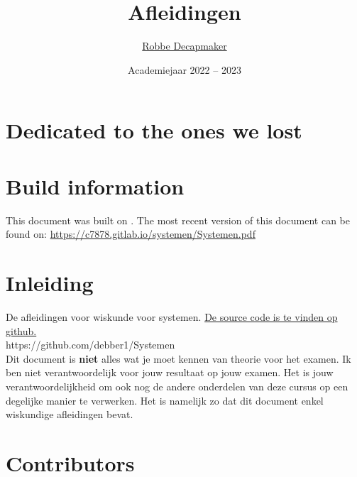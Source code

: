 \documentclass[a4paper,kul]{kulakarticle} %
\date{Academiejaar 2022 -- 2023}
\title{Afleidingen}
\author{\href{https://github.com/debber1}{Robbe Decapmaker}}
\begin{document}
\maketitle
\section*{Dedicated to the ones we lost}
\section*{Build information}
This document was built on \DTMNow.
\newline
The most recent version of this document can be found on: \href{https://c7878.gitlab.io/systemen/Systemen.pdf}{https://c7878.gitlab.io/systemen/Systemen.pdf}
\section*{Inleiding}

De afleidingen voor wiskunde voor systemen. \href{https://github.com/debber1/Systemen}{De source code is te vinden op github.}\\
https://github.com/debber1/Systemen\\
\newline
Dit document is \textbf{niet} alles wat je moet kennen van theorie voor het examen. Ik ben niet verantwoordelijk voor jouw resultaat op jouw examen. Het is jouw verantwoordelijkheid om ook nog de andere onderdelen van deze cursus op een degelijke manier te verwerken. Het is namelijk zo dat dit document enkel wiskundige afleidingen bevat.\\

\section*{Contributors}

\newpage

\newpage

\end{document}
